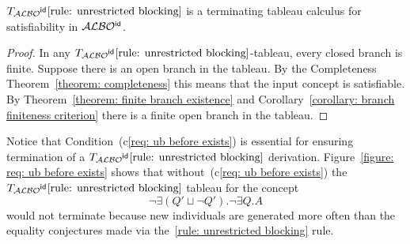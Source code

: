 \documentclass[leqno
,pdflatex
,prodmode
,acmtocl
]{acmsmall}
\newcommand{\mathcmd}[1]{\ensuremath{#1}\xspace}
\newcommand{\dlfont}{\mathcal}
\newcommand{\dl}[1]{\mathcmd{\dlfont{#1}}}
\newcommand{\idRole}{\mathcmd{\textsf{\upshape\mdseries id}}}
\newcommand{\ALBOid}{\dl{ALBO\smash[t]{\mbox{${}^{\idRole}$}}}}
\def\Not{\neg}
\def\Or{\sqcup}
\newcommand{\cname}{A}
\newcommand{\rname}{Q}
\newcommand{\TALBOidub}{\mathcmd{T_\ALBOid\eqref{rule: unrestricted blocking}}}
\begin{document}
\begin{theorem}[Termination]
 \TALBOidub is a terminating tableau calculus for satisfiability in \ALBOid.
\end{theorem}
\begin{proof}
In any $\TALBOidub$-tableau, every closed branch is
finite.
Suppose there is an open branch in the tableau.
By the Completeness Theorem~\ref{theorem: completeness} this means that the input concept is satisfiable.
By Theorem~\ref{theorem: finite branch existence} and Corollary~\ref{corollary: branch finiteness criterion}
there is a finite open branch in the tableau.
\end{proof}

Notice that
Condition~(c\ref{req: ub before exists}) is essential for ensuring termination
of a \TALBOidub derivation.
Figure~\ref{figure: req: ub before exists}
shows that 
without~(c\ref{req: ub before exists}) the 
\TALBOidub tableau for the concept 
\[\Not\exists(Q'\Or\Not Q').\Not\exists \rname.\cname\]
would not terminate because
new individuals are generated more often than the equality conjectures
made via the~\eqref{rule: unrestricted blocking}
rule.
\end{document}
